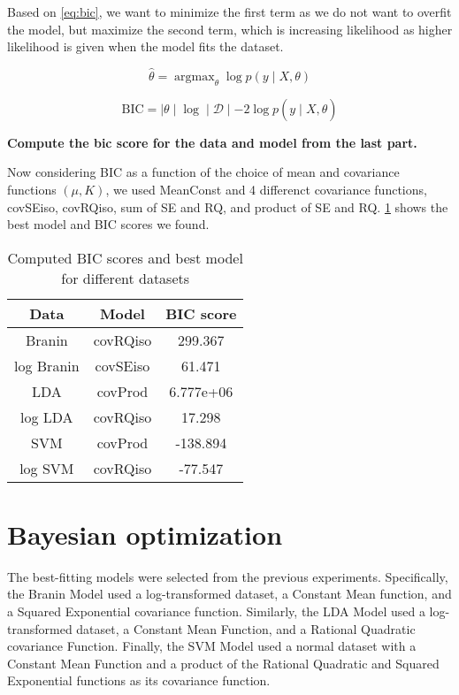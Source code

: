 \documentclass[11pt]{article}
\newcommand{\mc}[1]{\mathcal{#1}}
\newcommand{\data}{\mc{D}}
\DeclareMathOperator*{\argmax}{\arg\max}
\numberwithin{equation}{section}
\begin{document}
Based on \ref{eq:bic}, we want to minimize the first term as we do not want to overfit the model, but maximize the second term, which is increasing likelihood as higher likelihood is given when the model fits the dataset.

\begin{equation}
  \hat \theta = \argmax_\theta \log p(y \mid X, \theta)
  \label{eq:hyperparameter-estimate}
\end{equation}

\begin{equation}
  \text{BIC} = \mid \theta \mid \log \mid \data \mid - 2 \log p(y \mid X, \hat \theta)
  \label{eq:bic}
\end{equation}

\textbf{Compute the bic score for the data and model from the last part.}

Now considering BIC as a function of the choice of mean and covariance functions $(\mu, K)$, we used MeanConst and 4 differenct covariance functions, covSEiso, covRQiso, sum of SE and RQ, and product of SE and RQ. \ref{tab:bic_score} shows the best model and BIC scores we found.

\begin{table}[H]
  \centering
  \begin{tabular}{| c | c | c |}
    \hline
    Data       & Model    & BIC score \\
    \hline
    Branin     & covRQiso & 299.367   \\
    \hline
    log Branin & covSEiso & 61.471    \\
    \hline
    LDA        & covProd  & 6.777e+06 \\
    \hline
    log LDA    & covRQiso & 17.298    \\
    \hline
    SVM        & covProd  & -138.894  \\
    \hline
    log SVM    & covRQiso & -77.547   \\
    \hline
  \end{tabular}
  \caption{Computed BIC scores and best model for different datasets}
  \label{tab:bic_score}
\end{table}

\section*{Bayesian optimization}

The best-fitting models were selected from the previous experiments. 
Specifically, the Branin Model used a log-transformed dataset, a Constant Mean function, and a Squared Exponential covariance function.
Similarly, the LDA Model used a log-transformed dataset, a Constant Mean Function, and a Rational Quadratic covariance Function.
Finally, the SVM Model used a normal dataset with a Constant Mean Function and a product of the Rational Quadratic and Squared Exponential functions as its covariance function.
\end{document}
